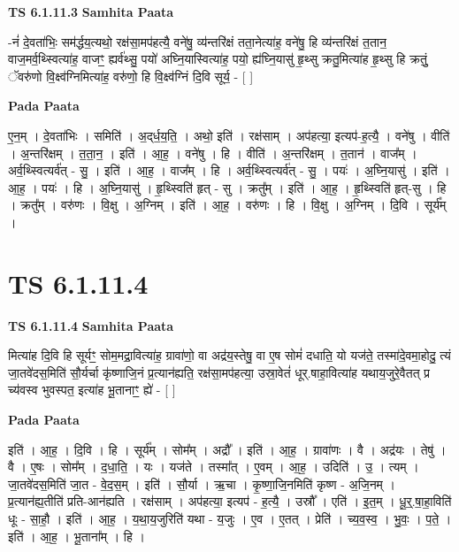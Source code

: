\documentclass[17pt]{extarticle}
\begin{document}
\textbf{TS 6.1.11.3 } \newline
\textbf{Samhita Paata} \newline

-नं॑ दे॒वता॑भिः॒ सम॑र्द्धय॒त्यथो॒ रक्ष॑सा॒मप॑हत्यै॒ वने॑षु॒ व्य॑न्तरि॑क्षं तता॒नेत्या॑ह॒ वने॑षु॒ हि व्य॑न्तरि॑क्षं त॒तान॒ वाज॒मर्व॒थ्स्वित्या॑ह॒ वाजꣳ॒॒ ह्यर्व॑थ्सु॒ पयो॑ अघ्नि॒यास्वित्या॑ह॒ पयो॒ ह्य॑घ्नि॒यासु॑ हृ॒थ्सु क्रतु॒मित्या॑ह हृ॒थ्सु हि क्रतुं॒ ॅवरु॑णो वि॒क्ष्व॑ग्निमित्या॑ह॒ वरु॑णो॒ हि वि॒क्ष्व॑ग्निं दि॒वि सूर्य॒ - [  ] \newline

\textbf{Pada Paata} \newline

ए॒न॒म् । दे॒वता॑भिः । समिति॑ । अ॒द्‌र्ध॒य॒ति॒ । अथो॒ इति॑ । रक्ष॑साम् । अप॑हत्या॒ इत्यप॑-ह॒त्यै॒ । वने॑षु । वीति॑ । अ॒न्तरि॑क्षम् । त॒ता॒न॒ । इति॑ । आ॒ह॒ । वने॑षु । हि । वीति॑ । अ॒न्तरि॑क्षम् । त॒तान॑ । वाज᳚म् । अर्व॒थ्स्वित्यर्व॑त् - सु॒ । इति॑ । आ॒ह॒ । वाज᳚म् । हि । अर्व॒थ्स्वित्यर्व॑त् - सु॒ । पयः॑ । अ॒घ्नि॒यासु॑ । इति॑ । आ॒ह॒ । पयः॑ । हि । अ॒घ्नि॒यासु॑ । हृ॒थ्स्विति॑ हृत् - सु । क्रतु᳚म् । इति॑ । आ॒ह॒ । हृ॒थ्स्विति॑ हृत्-सु । हि । क्रतु᳚म् । वरु॑णः । वि॒क्षु । अ॒ग्निम् । इति॑ । आ॒ह॒ । वरु॑णः । हि । वि॒क्षु । अ॒ग्निम् । दि॒वि । सूर्य᳚म् ।  \newline





\section{ TS 6.1.11.4 }

\textbf{TS 6.1.11.4 } \newline
\textbf{Samhita Paata} \newline

मित्या॑ह दि॒वि हि सूर्यꣳ॒॒ सोम॒मद्रा॒वित्या॑ह॒ ग्रावा॑णो॒ वा अद्र॑य॒स्तेषु॒ वा ए॒ष सोमं॑ दधाति॒ यो यज॑ते॒ तस्मा॑दे॒वमा॒होदु॒ त्यं जा॒तवे॑दस॒मिति॑ सौ॒र्यर्चा कृ॑ष्णाजि॒नं प्र॒त्यान॑ह्यति॒ रक्ष॑सा॒मप॑हत्या॒ उस्रा॒वेतं॑ धूर्.षाहा॒वित्या॑ह यथाय॒जुरे॒वैतत् प्र च्य॑वस्व भुवस्पत॒ इत्या॑ह भू॒तानाꣳ॒॒ ह्ये॑ - [  ] \newline

\textbf{Pada Paata} \newline

इति॑ । आ॒ह॒ । दि॒वि । हि । सूर्य᳚म् । सोम᳚म् । अद्रौ᳚ । इति॑ । आ॒ह॒ । ग्रावा॑णः । वै । अद्र॑यः । तेषु॑ । वै । ए॒षः । सोम᳚म् । द॒धा॒ति॒ । यः । यज॑ते । तस्मा᳚त् । ए॒वम् । आ॒ह॒ । उदिति॑ । उ॒ । त्यम् । जा॒तवे॑दस॒मिति॑ जा॒त - वे॒द॒स॒म् । इति॑ । सौ॒र्या । ऋ॒चा । कृ॒ष्णा॒जि॒नमिति॑ कृष्ण - अ॒जि॒नम् । प्र॒त्यान॑ह्य॒तीति॑ प्रति-आन॑ह्यति । रक्ष॑साम् । अप॑हत्या॒ इत्यप॑ - ह॒त्यै॒ । उस्रौ᳚ । एति॑ । इ॒त॒म् । धू॒र्॒.षा॒हा॒विति॑ धूः - सा॒हौ॒ । इति॑ । आ॒ह॒ । य॒था॒य॒जुरिति॑ यथा - य॒जुः । ए॒व । ए॒तत् । प्रेति॑ । च्य॒व॒स्व॒ । भु॒वः॒ । प॒ते॒ । इति॑ । आ॒ह॒ । भू॒ताना᳚म् । हि ।  \newline
\end{document}
